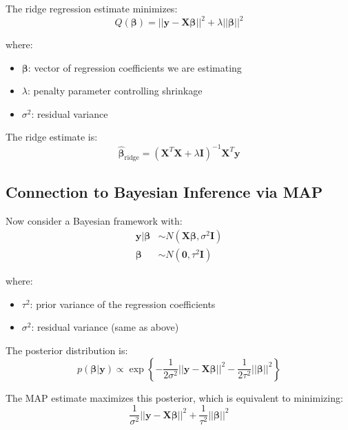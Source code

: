 \documentclass[12pt]{article}
\begin{document}
The ridge regression estimate minimizes:
\begin{equation}
Q(\boldsymbol{\beta}) = ||\mathbf{y} - \mathbf{X}\boldsymbol{\beta}||^2 + \lambda||\boldsymbol{\beta}||^2
\end{equation}

where:
\begin{itemize}
    \item $\boldsymbol{\beta}$: vector of regression coefficients we are estimating
    \item $\lambda$: penalty parameter controlling shrinkage
    \item $\sigma^2$: residual variance
\end{itemize}

The ridge estimate is:
\begin{equation}
\hat{\boldsymbol{\beta}}_{\text{ridge}} = (\mathbf{X}^T\mathbf{X} + \lambda\mathbf{I})^{-1}\mathbf{X}^T\mathbf{y}
\end{equation}

\subsection{Connection to Bayesian Inference via MAP}

Now consider a Bayesian framework with:
\begin{align}
\mathbf{y}|\boldsymbol{\beta} &\sim N(\mathbf{X}\boldsymbol{\beta}, \sigma^2\mathbf{I}) \\
\boldsymbol{\beta} &\sim N(\mathbf{0}, \tau^2\mathbf{I})
\end{align}

where:
\begin{itemize}
    \item $\tau^2$: prior variance of the regression coefficients
    \item $\sigma^2$: residual variance (same as above)
\end{itemize}

The posterior distribution is:
\begin{equation}
p(\boldsymbol{\beta}|\mathbf{y}) \propto \exp\left\{-\frac{1}{2\sigma^2}||\mathbf{y} - \mathbf{X}\boldsymbol{\beta}||^2 - \frac{1}{2\tau^2}||\boldsymbol{\beta}||^2\right\}
\end{equation}

The MAP estimate maximizes this posterior, which is equivalent to minimizing:
\begin{equation}
\frac{1}{\sigma^2}||\mathbf{y} - \mathbf{X}\boldsymbol{\beta}||^2 + \frac{1}{\tau^2}||\boldsymbol{\beta}||^2
\end{equation}
\end{document}
